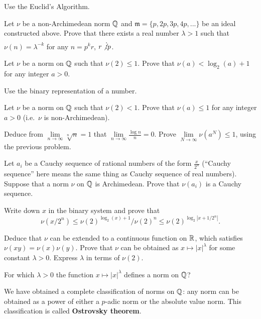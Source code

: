 \documentclass[12pt]{article}
\begin{document}
\begin{ukazanie} Use the Euclid's Algorithm.
\end{ukazanie}

\begin{zadacha}[*] Let $\nu$ be a non-Archimedean norm ${\mathbb Q}$ and
  $\mathfrak m = \{p, 2p, 3p, 4p, ...\}$ be an ideal constructed
  above. Prove that there exists a real number $\lambda>1$ such that
  $\nu(n) = \lambda^{-k}$ for any $n=p^k r$, $r\not\vdots p$.
\end{zadacha}

\begin{zadacha}[*] Let $\nu$ be a norm on ${\mathbb Q}$ such that
 $\nu(2)\leq 1$. Prove that $\nu(a)< \log_2 (a)+1$
for any integer $a>0$.
\end{zadacha}

\begin{ukazanie} Use the binary representation of a number.
\end{ukazanie}

\begin{zadacha}[*] Let $\nu$ be a norm on ${\mathbb Q}$ such that
  $\nu(2)<1$. Prove that $\nu(a)\leq 1$ for any integer $a>0$ (i.e.\
  $\nu$ is non-Archimedean).
\end{zadacha}

\begin{ukazanie} Deduce from
$\lim\limits_{n\to \infty} \sqrt[n]{n}=1$ that
$\lim\limits_{n\to \infty} \frac{\log n}{n}=0$. Prove
$\lim\limits_{N\to \infty} \nu(a^N)\leq 1$, using the previous
problem. 
\end{ukazanie}

\begin{zadacha}[*] Let $a_i$ be a Cauchy sequence of rational numbers
  of the form $\frac{x}{2^n}$ (``Cauchy sequence'' here means the same
  thing as Cauchy sequence of real numbers).  Suppose that a norm
  $\nu$ on ${\mathbb Q}$ is Archimedean.  Prove that $\nu(a_i)$ is a Cauchy
  sequence.
\end{zadacha}

\begin{ukazanie}
Write down $x$ in the binary system and prove that 
 \[ \nu(x/2^n)\leq
  \nu(2)^{\log_2(x)+1} /\nu(2)^n\leq \nu(2)^{\log_2|x+1/2^n|}.\]
\end{ukazanie}

\begin{zadacha}[*] Deduce that
$\nu$ can be extended to a continuous function on ${\mathbb R}$,
which satisfies $\nu(xy)=\nu(x)\nu(y)$. Prove that 
$\nu$ can be obtained as $x \mapsto |x|^\lambda$ for some constant
$\lambda>0$. Express $\lambda$ in terms of $\nu(2)$.
\end{zadacha}

\begin{zadacha}[*] For which $\lambda>0$ the function  $x \mapsto
|x|^\lambda$ defines a norm on ${\mathbb Q}$?
\end{zadacha}

We have obtained a complete classification of norms on ${\mathbb Q}$: any norm
can be obtained as a power of either a $p$-adic norm or the 
absolute value norm. This classification is called {\bf Ostrovsky theorem}.
\end{document}
